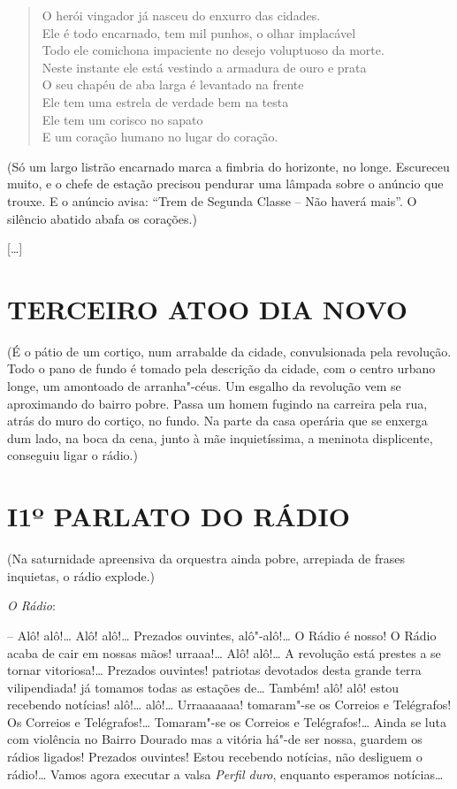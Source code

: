 \begin{verse}
O herói vingador já nasceu do enxurro das cidades.\\
Ele é todo encarnado, tem mil punhos, o olhar implacável\\
Todo ele comichona impaciente no desejo voluptuoso da morte.\\
Neste instante ele está vestindo a armadura de ouro e prata\\
O seu chapéu de aba larga é levantado na frente\\
Ele tem uma estrela de verdade bem na testa\\
Ele tem um corisco no sapato\\
E um coração humano no lugar do coração.
\end{verse}

\hfill\parbox{150pt}{
(Só um largo listrão encarnado marca a fimbria do horizonte, no longe.
Escureceu muito, e o chefe de estação precisou pendurar uma lâmpada
sobre o anúncio que trouxe. E o anúncio avisa: ``Trem de Segunda Classe
-- Não haverá mais''. O silêncio abatido abafa os corações.)
}

{[}\ldots{}{]}

\pagebreak
\section*{TERCEIRO ATO\break O DIA NOVO}

\hfill\parbox{150pt}{
(É o pátio de um cortiço, num arrabalde da cidade, convulsionada pela
revolução. Todo o pano de fundo é tomado pela descrição da cidade, com o
centro urbano longe, um amontoado de arranha"-céus. Um esgalho da
revolução vem se aproximando do bairro pobre. Passa um homem fugindo na
carreira pela rua, atrás do muro do cortiço, no fundo. Na parte da casa
operária que se enxerga dum lado, na boca da cena, junto à mãe
inquietíssima, a meninota displicente, conseguiu ligar o rádio.)
}

\section*{I\break 1º PARLATO DO RÁDIO}

\hfill\parbox{150pt}{
(Na saturnidade apreensiva da orquestra ainda pobre, arrepiada de frases
inquietas, o rádio explode.)
}

\emph{O Rádio}:

-- Alô! alô!\ldots{} Alô! alô!\ldots{} Prezados ouvintes, alô"-alô!\ldots{} O
Rádio é nosso! O Rádio acaba de cair em nossas mãos! urraaa!\ldots{} Alô!
alô!\ldots{} A revolução está prestes a se tornar vitoriosa!\ldots{} Prezados
ouvintes! patriotas devotados desta grande terra vilipendiada! já
tomamos todas as estações de\ldots{} Também! alô! alô! estou recebendo
notícias! alô!\ldots{} alô!\ldots{} Urraaaaaaa! tomaram"-se os Correios e
Telégrafos! Os Correios e Telégrafos!\ldots{} Tomaram"-se os Correios e
Telégrafos!\ldots{} Ainda se luta com violência no Bairro Dourado mas a
vitória há"-de ser nossa, guardem os rádios ligados! Prezados ouvintes!
Estou recebendo notícias, não desliguem o rádio!\ldots{} Vamos agora executar
a valsa \emph{Perfil duro}, enquanto esperamos notícias\ldots{}

